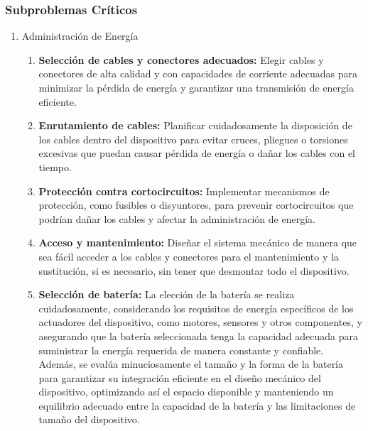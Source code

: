 \subsubsection{Subproblemas Críticos}
\begin{enumerate}[label=\alph*)]
    \item Administración de Energía
        \needspace{3cm}
        \begin{enumerate}[label=\Roman*)]
            \item \textbf{Selección de cables y conectores adecuados:} Elegir cables y conectores de alta calidad y con capacidades de corriente adecuadas para minimizar la pérdida de energía y garantizar una transmisión de energía eficiente.
    
            \needspace{3cm}
            \item \textbf{Enrutamiento de cables:} Planificar cuidadosamente la disposición de los cables dentro del dispositivo para evitar cruces, pliegues o torsiones excesivas que puedan causar pérdida de energía o dañar los cables con el tiempo.
    
            \needspace{3cm}
            \item \textbf{Protección contra cortocircuitos:} Implementar mecanismos de protección, como fusibles o disyuntores, para prevenir cortocircuitos que podrían dañar los cables y afectar la administración de energía.
    
            \needspace{3cm}
            \item \textbf{Acceso y mantenimiento:} Diseñar el sistema mecánico de manera que sea fácil acceder a los cables y conectores para el mantenimiento y la sustitución, si es necesario, sin tener que desmontar todo el dispositivo.
    
            \item \textbf{Selección de batería:} La elección de la batería se realiza cuidadosamente, considerando los requisitos de energía específicos de los actuadores del dispositivo, como motores, sensores y otros componentes, y asegurando que la batería seleccionada tenga la capacidad adecuada para suministrar la energía requerida de manera constante y confiable. Además, se evalúa minuciosamente el tamaño y la forma de la batería para garantizar su integración eficiente en el diseño mecánico del dispositivo, optimizando así el espacio disponible y manteniendo un equilibrio adecuado entre la capacidad de la batería y las limitaciones de tamaño del dispositivo.
        \end{enumerate}
        

\end{enumerate}
